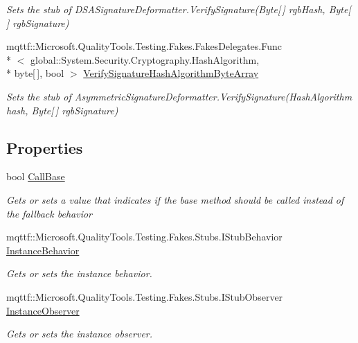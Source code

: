 \begin{DoxyCompactItemize}
\begin{DoxyCompactList}\small\item\em Sets the stub of D\-S\-A\-Signature\-Deformatter.\-Verify\-Signature(\-Byte\mbox{[}$\,$\mbox{]} rgb\-Hash, Byte\mbox{[}$\,$\mbox{]} rgb\-Signature)\end{DoxyCompactList}\item 
mqttf\-::\-Microsoft.\-Quality\-Tools.\-Testing.\-Fakes.\-Fakes\-Delegates.\-Func\\*
$<$ global\-::\-System.\-Security.\-Cryptography.\-Hash\-Algorithm, \\*
byte\mbox{[}$\,$\mbox{]}, bool $>$ \hyperlink{class_system_1_1_security_1_1_cryptography_1_1_fakes_1_1_stub_d_s_a_signature_deformatter_a5e0499e4ac8a809e111beae7992e1dc3}{Verify\-Signature\-Hash\-Algorithm\-Byte\-Array}
\begin{DoxyCompactList}\small\item\em Sets the stub of Asymmetric\-Signature\-Deformatter.\-Verify\-Signature(\-Hash\-Algorithm hash, Byte\mbox{[}$\,$\mbox{]} rgb\-Signature)\end{DoxyCompactList}\end{DoxyCompactItemize}
\subsection*{Properties}
\begin{DoxyCompactItemize}
\item 
bool \hyperlink{class_system_1_1_security_1_1_cryptography_1_1_fakes_1_1_stub_d_s_a_signature_deformatter_a79b1d27c59215ae8e815f75a0c555d71}{Call\-Base}
\begin{DoxyCompactList}\small\item\em Gets or sets a value that indicates if the base method should be called instead of the fallback behavior\end{DoxyCompactList}\item 
mqttf\-::\-Microsoft.\-Quality\-Tools.\-Testing.\-Fakes.\-Stubs.\-I\-Stub\-Behavior \hyperlink{class_system_1_1_security_1_1_cryptography_1_1_fakes_1_1_stub_d_s_a_signature_deformatter_a3cf25856eed69bb6be5885d195c74481}{Instance\-Behavior}
\begin{DoxyCompactList}\small\item\em Gets or sets the instance behavior.\end{DoxyCompactList}\item 
mqttf\-::\-Microsoft.\-Quality\-Tools.\-Testing.\-Fakes.\-Stubs.\-I\-Stub\-Observer \hyperlink{class_system_1_1_security_1_1_cryptography_1_1_fakes_1_1_stub_d_s_a_signature_deformatter_afaf9df47363ffbbb9b38dfa5ec86dc6a}{Instance\-Observer}
\begin{DoxyCompactList}\small\item\em Gets or sets the instance observer.\end{DoxyCompactList}\end{DoxyCompactItemize}


